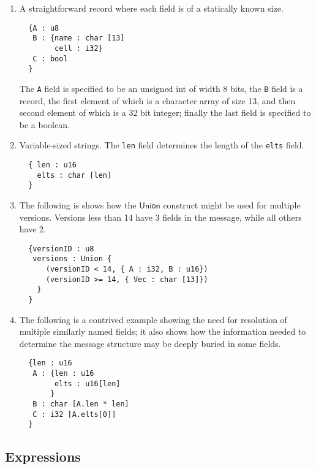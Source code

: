 \documentclass[svgnames]{llncs}
\newcommand{\konst}[1]{\ensuremath{\mathsf{#1}}}
\begin{document}
\begin{enumerate}

\item A straightforward record where each field is of a statically known size.

\begin{verbatim}
  {A : u8
   B : {name : char [13]
        cell : i32}
   C : bool
  }
\end{verbatim}

The \verb+A+ field is specified to be an unsigned int of width 8 bits,
the \verb+B+ field is a record, the first element of which is a
character array of size 13, and then second element of which is a 32
bit integer; finally the last field is specified to be a
boolean.

\item Variable-sized strings. The \verb+len+ field determines the
  length of the \verb+elts+ field.

\begin{verbatim}
  { len : u16
    elts : char [len]
  }
\end{verbatim}


\item The following is shows how the \konst{Union} construct might be
  used for multiple versions.  Versions less than 14 have 3 fields in
  the message, while all others have 2.

\begin{verbatim}
  {versionID : u8
   versions : Union {
      (versionID < 14, { A : i32, B : u16})
      (versionID >= 14, { Vec : char [13]})
    }
  }
\end{verbatim}

\item The following is a contrived example showing the need for
  resolution of multiple similarly named fields; it also shows how the
  information needed to determine the message structure may be deeply
  buried in some fields.

\begin{verbatim}
  {len : u16
   A : {len : u16
        elts : u16[len]
       }
   B : char [A.len * len]
   C : i32 [A.elts[0]]
  }
\end{verbatim}

\end{enumerate}

\subsection{Expressions}
\end{document}
